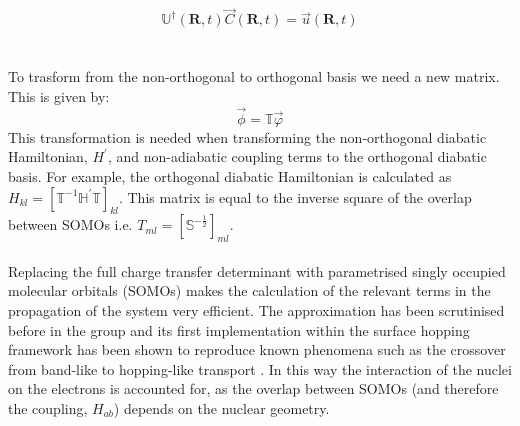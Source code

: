 \begin{equation}
  \mathbb{U}^{\dagger}(\textbf{R}, t) \vec{C}(\textbf{R}, t) = \vec{u}(\textbf{R}, t)
  \label{eq:diab_to_adiab}
\end{equation}
\\\\
To trasform from the non-orthogonal to orthogonal basis we need a new matrix. This is given by:
\begin{equation}
  \vec{\phi} = \mathbb{T} \vec{\varphi}
  \label{eq:orth_to_nonorth}
\end{equation}
This transformation is needed when transforming the non-orthogonal diabatic Hamiltonian, $H^{'}$, and non-adiabatic coupling terms to the orthogonal diabatic basis. For example, the orthogonal diabatic Hamiltonian is calculated as $H_{kl} = \left[\mathbb{T}^{-1} \mathbb{H}^{'} \mathbb{T} \right]_{kl}$. This matrix is equal to the inverse square of the overlap between SOMOs i.e. $T_{ml} = [\mathbb{S}^{-\frac{1}{2}}]_{ml}$.
\\\\
Replacing the full charge transfer determinant with parametrised singly occupied molecular orbitals (SOMOs) makes the calculation of the relevant terms in the propagation of the system very efficient. The approximation has been scrutinised before in the group
\cite{giannini_crossover_2018, carof_detailed_2017, gajdos_ultrafast_2014, Gajdos2013Mar, spencer_confronting_2016, spencer_fob-sh:_2016} and its first implementation within the surface hopping framework has been shown to reproduce known phenomena such as the crossover from band-like to hopping-like transport \cite{giannini_crossover_2018}. In this way the interaction of the nuclei on the electrons is accounted for, as the overlap between SOMOs (and therefore the coupling, $H_{ab}$) depends on the nuclear geometry.
